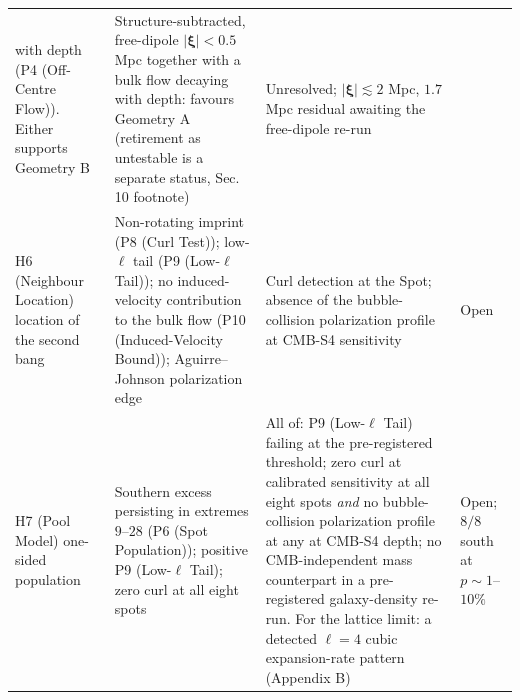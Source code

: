 \documentclass[
]{article}
\begin{document}
\begin{longtable}[]{@{}llll@{}}
\begin{minipage}[t]{0.22\columnwidth}
with depth (P4 (Off-Centre Flow)). Either supports Geometry B\strut
\end{minipage} & \begin{minipage}[t]{0.22\columnwidth}\raggedright
Structure-subtracted, free-dipole \(|\boldsymbol{\xi}| < 0.5\) Mpc
together with a bulk flow decaying with depth: favours Geometry A
(retirement as untestable is a separate status, Sec. 10 footnote)\strut
\end{minipage} & \begin{minipage}[t]{0.22\columnwidth}\raggedright
Unresolved; \(|\boldsymbol{\xi}| \lesssim 2\) Mpc, \(1.7\) Mpc residual
awaiting the free-dipole re-run\strut
\end{minipage}\tabularnewline
\begin{minipage}[t]{0.22\columnwidth}\raggedright
H6 (Neighbour Location) location of the second bang\strut
\end{minipage} & \begin{minipage}[t]{0.22\columnwidth}\raggedright
Non-rotating imprint (P8 (Curl Test)); low-\(\ell\) tail (P9
(Low-\(\ell\) Tail)); no induced-velocity contribution to the bulk flow
(P10 (Induced-Velocity Bound)); Aguirre--Johnson polarization edge\strut
\end{minipage} & \begin{minipage}[t]{0.22\columnwidth}\raggedright
Curl detection at the Spot; absence of the bubble-collision polarization
profile at CMB-S4 sensitivity\strut
\end{minipage} & \begin{minipage}[t]{0.22\columnwidth}\raggedright
Open\strut
\end{minipage}\tabularnewline
\begin{minipage}[t]{0.22\columnwidth}\raggedright
H7 (Pool Model) one-sided population\strut
\end{minipage} & \begin{minipage}[t]{0.22\columnwidth}\raggedright
Southern excess persisting in extremes \(9\)--\(28\) (P6 (Spot
Population)); positive P9 (Low-\(\ell\) Tail); zero curl at all eight
spots\strut
\end{minipage} & \begin{minipage}[t]{0.22\columnwidth}\raggedright
All of: P9 (Low-\(\ell\) Tail) failing at the pre-registered threshold;
zero curl at calibrated sensitivity at all eight spots \emph{and} no
bubble-collision polarization profile at any at CMB-S4 depth; no
CMB-independent mass counterpart in a pre-registered galaxy-density
re-run. For the lattice limit: a detected \(\ell=4\) cubic
expansion-rate pattern (Appendix B)\strut
\end{minipage} & \begin{minipage}[t]{0.22\columnwidth}\raggedright
Open; \(8/8\) south at \(p \sim 1\)--\(10\%\)\strut
\end{minipage}\tabularnewline
\bottomrule
\end{longtable}
\end{document}
